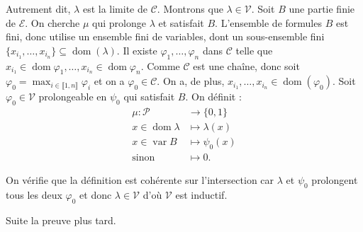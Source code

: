 \documentclass[./main]{subfiles}
\begin{document}
\begin{prv}
    Autrement dit, $\lambda$ est la limite de $\mathcal{C}$.
    Montrons que $\lambda \in \mathcal{V}$.
    Soit $B$ une partie finie de $\mathcal{E}$. On cherche $\mu$ qui prolonge $\lambda$ et satisfait $B$.
    L'ensemble de formules $B$ est fini, donc utilise un ensemble fini de variables, dont un sous-ensemble fini $\{x_{i_1}, \ldots, x_{i_n}\} \subseteq \operatorname{dom}(\lambda)$.
    Il existe $\varphi_1, \ldots, \varphi_n$ dans $\mathcal{C}$ telle que $x_{i_1} \in \operatorname{dom} \varphi_1, \ldots, x_{i_n} \in \operatorname{dom} \varphi_n$.
    Comme $\mathcal{C}$ est une chaîne, donc soit $\varphi_0 = \max_{i \in \llbracket 1,n\rrbracket} \varphi_i$ et on a $\varphi_0 \in \mathcal{C}$.
    On a, de plus, $x_{i_1}, \ldots, x_{i_n} \in \operatorname{dom}(\varphi_0)$.
    Soit $\varphi_0 \in \mathcal{V}$ prolongeable en $\psi_0$ qui satisfait $B$.
    On définit :
    \begin{align*}
      \mu: \mathcal{P} &\longrightarrow \{0,1\}  \\
      x \in \operatorname{dom} \lambda &\longmapsto \lambda(x) \\
      x \in \operatorname{var} B &\longmapsto \psi_0(x) \\
      \text{sinon} &\longmapsto 0
    .\end{align*}

    On vérifie que la définition est cohérente sur l'intersection car $\lambda$ et $\psi_0$ prolongent tous les deux $\varphi_0$ et donc  $\lambda \in \mathcal{V}$ d'où $\mathcal{V}$ est inductif.

    Suite la preuve plus tard.
  \end{prv}
\end{document}
